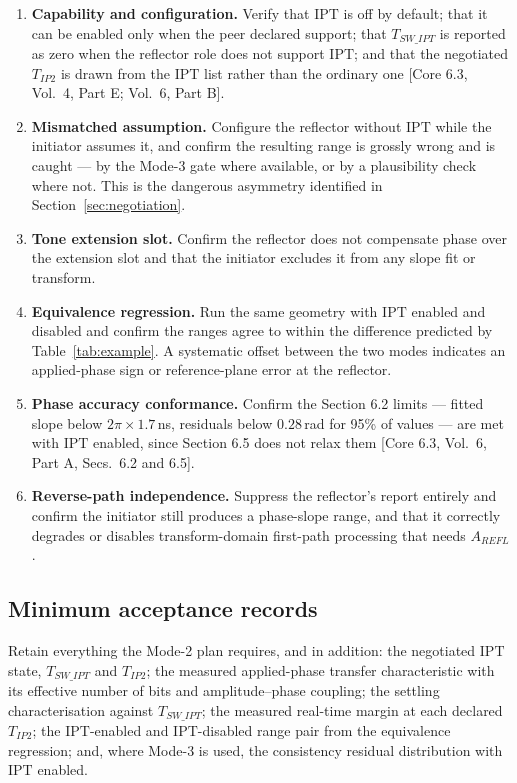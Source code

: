 \documentclass[11pt,a4paper]{article}
\newcommand{\IPT}{\ensuremath{\mathrm{IPT}}}
\newcommand{\Tswipt}{T_{SW\_IPT}}
\newcommand{\Tiptwo}{T_{IP2}}
\newcommand{\core}[1]{\textcolor{rulegrey}{\small[Core 6.3, #1]}}
\begin{document}
\begin{enumerate}[leftmargin=1.7em,itemsep=2pt]
    failure mode that Section~\ref{sec:lost} says is otherwise invisible.
  \item \textbf{Capability and configuration.} Verify that \IPT{} is off by default; that it can be
    enabled only when the peer declared support; that $\Tswipt$ is reported as zero when the
    reflector role does not support \IPT; and that the negotiated $\Tiptwo$ is drawn from the \IPT{}
    list rather than the ordinary one \core{Vol.\ 4, Part E; Vol.\ 6, Part B}.
  \item \textbf{Mismatched assumption.} Configure the reflector without \IPT{} while the initiator
    assumes it, and confirm the resulting range is grossly wrong and is caught --- by the Mode-3 gate
    where available, or by a plausibility check where not. This is the dangerous asymmetry identified
    in Section~\ref{sec:negotiation}.
  \item \textbf{Tone extension slot.} Confirm the reflector does not compensate phase over the
    extension slot and that the initiator excludes it from any slope fit or transform.
  \item \textbf{Equivalence regression.} Run the same geometry with \IPT{} enabled and disabled and
    confirm the ranges agree to within the difference predicted by Table~\ref{tab:example}. A
    systematic offset between the two modes indicates an applied-phase sign or reference-plane error
    at the reflector.
  \item \textbf{Phase accuracy conformance.} Confirm the Section 6.2 limits --- fitted slope below
    $2\pi\times1.7$\,ns, residuals below $0.28$\,rad for 95\% of values --- are met with \IPT{}
    enabled, since Section 6.5 does not relax them \core{Vol.\ 6, Part A, Secs.\ 6.2 and 6.5}.
  \item \textbf{Reverse-path independence.} Suppress the reflector's report entirely and confirm the
    initiator still produces a phase-slope range, and that it correctly degrades or disables
    transform-domain first-path processing that needs $A_{REFL}$.
\end{enumerate}

\subsection{Minimum acceptance records}

Retain everything the Mode-2 plan requires, and in addition: the negotiated \IPT{} state,
$\Tswipt$ and $\Tiptwo$; the measured applied-phase transfer characteristic with its effective
number of bits and amplitude--phase coupling; the settling characterisation against $\Tswipt$; the
measured real-time margin at each declared $\Tiptwo$; the \IPT-enabled and \IPT-disabled range pair
from the equivalence regression; and, where Mode-3 is used, the consistency residual distribution
with \IPT{} enabled.
\end{document}
